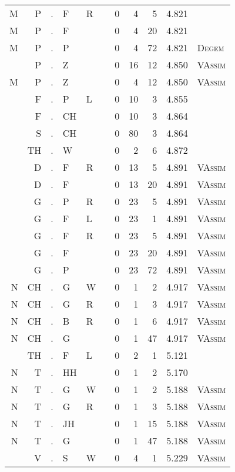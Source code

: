 \begin{longtable}{r@{ } r@{ } c@{ } l@{ } l@{ } l@{ } r r r r l }
M & P & . & F & R &   & 0 & 4 & 5 & 4.821 &  \\
M & P & . & F &   &   & 0 & 4 & 20 & 4.821 &  \\
M & P & . & P &   &   & 0 & 4 & 72 & 4.821 & \textsc{Degem} \\
  & P & . & Z &   &   & 0 & 16 & 12 & 4.850 & \textsc{VAssim} \\
M & P & . & Z &   &   & 0 & 4 & 12 & 4.850 & \textsc{VAssim} \\
  & F & . & P & L &   & 0 & 10 & 3 & 4.855 &  \\
  & F & . & CH &   &   & 0 & 10 & 3 & 4.864 &  \\
  & S & . & CH &   &   & 0 & 80 & 3 & 4.864 &  \\
  & TH & . & W &   &   & 0 & 2 & 6 & 4.872 &  \\
  & D & . & F & R &   & 0 & 13 & 5 & 4.891 & \textsc{VAssim} \\
  & D & . & F &   &   & 0 & 13 & 20 & 4.891 & \textsc{VAssim} \\
  & G & . & P & R &   & 0 & 23 & 5 & 4.891 & \textsc{VAssim} \\
  & G & . & F & L &   & 0 & 23 & 1 & 4.891 & \textsc{VAssim} \\
  & G & . & F & R &   & 0 & 23 & 5 & 4.891 & \textsc{VAssim} \\
  & G & . & F &   &   & 0 & 23 & 20 & 4.891 & \textsc{VAssim} \\
  & G & . & P &   &   & 0 & 23 & 72 & 4.891 & \textsc{VAssim} \\
N & CH & . & G & W &   & 0 & 1 & 2 & 4.917 & \textsc{VAssim} \\
N & CH & . & G & R &   & 0 & 1 & 3 & 4.917 & \textsc{VAssim} \\
N & CH & . & B & R &   & 0 & 1 & 6 & 4.917 & \textsc{VAssim} \\
N & CH & . & G &   &   & 0 & 1 & 47 & 4.917 & \textsc{VAssim} \\
  & TH & . & F & L &   & 0 & 2 & 1 & 5.121 &  \\
N & T & . & HH &   &   & 0 & 1 & 2 & 5.170 &  \\
N & T & . & G & W &   & 0 & 1 & 2 & 5.188 & \textsc{VAssim} \\
N & T & . & G & R &   & 0 & 1 & 3 & 5.188 & \textsc{VAssim} \\
N & T & . & JH &   &   & 0 & 1 & 15 & 5.188 & \textsc{VAssim} \\
N & T & . & G &   &   & 0 & 1 & 47 & 5.188 & \textsc{VAssim} \\
  & V & . & S & W &   & 0 & 4 & 1 & 5.229 & \textsc{VAssim} \\

\end{longtable}
